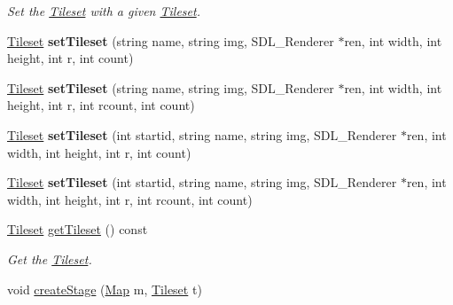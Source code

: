 \begin{DoxyCompactItemize}
\begin{DoxyCompactList}\small\item\em Set the \hyperlink{classTileset}{Tileset} with a given \hyperlink{classTileset}{Tileset}. \end{DoxyCompactList}\item 
\hyperlink{classTileset}{Tileset} {\bfseries set\+Tileset} (string name, string img, S\+D\+L\+\_\+\+Renderer $\ast$ren, int width, int height, int r, int count)\hypertarget{classStage_ab62ad01c46da0337c294c4790020306f}{}\label{classStage_ab62ad01c46da0337c294c4790020306f}

\item 
\hyperlink{classTileset}{Tileset} {\bfseries set\+Tileset} (string name, string img, S\+D\+L\+\_\+\+Renderer $\ast$ren, int width, int height, int r, int rcount, int count)\hypertarget{classStage_a6e71c30197676d98a4a5694ad8b5a733}{}\label{classStage_a6e71c30197676d98a4a5694ad8b5a733}

\item 
\hyperlink{classTileset}{Tileset} {\bfseries set\+Tileset} (int startid, string name, string img, S\+D\+L\+\_\+\+Renderer $\ast$ren, int width, int height, int r, int count)\hypertarget{classStage_ab90d4d0315e6991f2ed8216b6c804339}{}\label{classStage_ab90d4d0315e6991f2ed8216b6c804339}

\item 
\hyperlink{classTileset}{Tileset} {\bfseries set\+Tileset} (int startid, string name, string img, S\+D\+L\+\_\+\+Renderer $\ast$ren, int width, int height, int r, int rcount, int count)\hypertarget{classStage_a42ee2fbdb79971f90984f603fcad54d6}{}\label{classStage_a42ee2fbdb79971f90984f603fcad54d6}

\item 
\hyperlink{classTileset}{Tileset} \hyperlink{classStage_a7c41f0bf5dcdac398169c5a2e92196f3}{get\+Tileset} () const \hypertarget{classStage_a7c41f0bf5dcdac398169c5a2e92196f3}{}\label{classStage_a7c41f0bf5dcdac398169c5a2e92196f3}

\begin{DoxyCompactList}\small\item\em Get the \hyperlink{classTileset}{Tileset}. \end{DoxyCompactList}\item 
void \hyperlink{classStage_a716561c7b2b148b67e7cf4952bae937b}{create\+Stage} (\hyperlink{classMap}{Map} m, \hyperlink{classTileset}{Tileset} t)\hypertarget{classStage_a716561c7b2b148b67e7cf4952bae937b}{}\label{classStage_a716561c7b2b148b67e7cf4952bae937b}


\end{DoxyCompactItemize}
